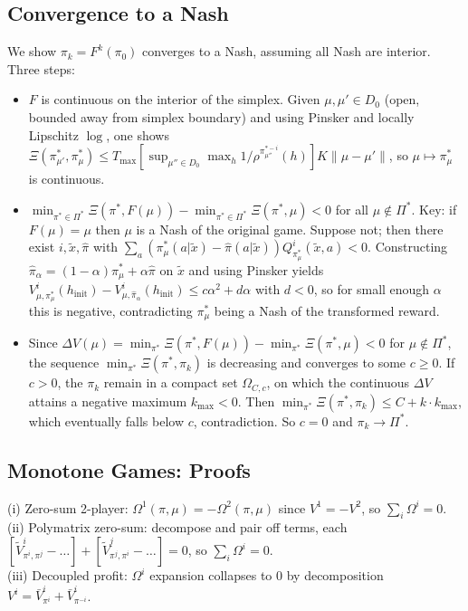 \subsection{Convergence to a Nash}
We show $\pi_k=F^k(\pi_0)$ converges to a Nash, assuming all Nash are interior. Three steps:
\begin{itemize}
\item $F$ is continuous on the interior of the simplex. Given $\mu,\mu'\in D_0$ (open, bounded away from simplex boundary) and using Pinsker and locally Lipschitz $\log$, one shows $\Xi(\pi^*_{\mu'},\pi^*_\mu) \leq T_{\max}[\sup_{\mu''\in D_0}\max_h 1/\rho^{\pi^{*-i}_{\mu''}}(h)]K\|\mu-\mu'\|$, so $\mu\mapsto\pi^*_\mu$ is continuous.
\item $\min_{\pi^*\in\Pi^*}\Xi(\pi^*, F(\mu)) - \min_{\pi^*\in\Pi^*}\Xi(\pi^*, \mu) < 0$ for all $\mu\notin\Pi^*$. Key: if $F(\mu)=\mu$ then $\mu$ is a Nash of the original game. Suppose not; then there exist $i,\tilde x,\hat\pi$ with $\sum_a(\pi^*_\mu(a|\tilde x)-\hat\pi(a|\tilde x))Q^i_{\pi^*_\mu}(\tilde x,a)<0$. Constructing $\hat\pi_\alpha = (1-\alpha)\pi^*_\mu + \alpha\hat\pi$ on $\tilde x$ and using Pinsker yields $V^i_{\mu,\pi^*_\mu}(h_{\textrm{init}}) - V^i_{\mu,\hat\pi_\alpha}(h_{\textrm{init}}) \leq c\alpha^2 + d\alpha$ with $d<0$, so for small enough $\alpha$ this is negative, contradicting $\pi^*_\mu$ being a Nash of the transformed reward.
\item Since $\Delta V(\mu) = \min_{\pi^*}\Xi(\pi^*, F(\mu)) - \min_{\pi^*}\Xi(\pi^*,\mu) < 0$ for $\mu\notin\Pi^*$, the sequence $\min_{\pi^*}\Xi(\pi^*,\pi_k)$ is decreasing and converges to some $c\geq 0$. If $c>0$, the $\pi_k$ remain in a compact set $\Omega_{C,c}$, on which the continuous $\Delta V$ attains a negative maximum $k_{\max}<0$. Then $\min_{\pi^*}\Xi(\pi^*,\pi_k) \leq C + k \cdot k_{\max}$, which eventually falls below $c$, contradiction. So $c=0$ and $\pi_k \to \Pi^*$.
\end{itemize}

\subsection{Monotone Games: Proofs}
(i) Zero-sum 2-player: $\Omega^1(\pi,\mu) = -\Omega^2(\pi,\mu)$ since $V^1 = -V^2$, so $\sum_i\Omega^i=0$.\\
(ii) Polymatrix zero-sum: decompose and pair off terms, each $[\tilde V^i_{\pi^i,\pi^j} - \ldots] + [\tilde V^j_{\pi^j,\pi^i} - \ldots] = 0$, so $\sum_i\Omega^i=0$.\\
(iii) Decoupled profit: $\Omega^i$ expansion collapses to 0 by decomposition $V^i = \bar V^i_{\pi^i} + \bar V^i_{\pi^{-i}}$.

